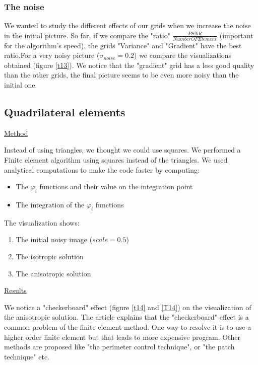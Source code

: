 \documentclass{report}
\renewcommand\phi{\varphi}
\begin{document}
\subsubsection{The noise}


We wanted to study the different effects of our grids when we increase the noise in the initial picture. So far, if we compare the "ratio" $\frac{PSNR}{NumberOFElement}$ (important for the algorithm's speed), the grids "Variance" and "Gradient" have the best ratio.For a very noisy picture ($\sigma_{noise}=0.2$) we compare the visualizations obtained (figure \ref{t13}). We notice that the "gradient" grid has a less good quality than the other grids, the final picture seems to be even more noisy than the initial one.  







\subsection{Quadrilateral elements}

\underline{Method}

Instead of using triangles, we thought we could use squares. We performed a Finite element algorithm using squares instead of the triangles. We used analytical computations to make the code faster by computing: 

\begin{itemize}
    \item 
    The $\phi_i$ functions and their value on the integration point 
    \item 
    The integration of the $\phi_i$ functions 
    
\end{itemize}

The visualization shows: 
\begin{enumerate}
\item 
The initial noisy image ($scale=0.5$)
\item 
The isotropic solution 
\item 
The anisotropic solution
\end{enumerate}



\underline{Results}

We notice a "checkerboard" effect (figure \ref{t14} and \ref{T14}) on the visualization of the anisotropic solution. The article \cite{shukla2013} explains that the "checkerboard" effect is a common problem of the finite element method. One way to resolve it is to use a higher order finite element but that leads to more expensive program. Other methods are proposed like "the perimeter control technique", or "the patch technique" etc. 
\end{document}
